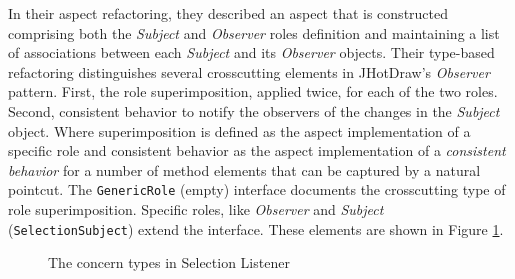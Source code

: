 In their aspect refactoring, they described an aspect that is constructed comprising both the \textit{Subject} and \textit{Observer} roles definition and maintaining a list of associations between each \textit{Subject} and its \textit{Observer} objects.
Their type-based refactoring\cite{marin2005approach} distinguishes several crosscutting elements in JHotDraw's \textit{Observer} pattern. 
First, the role superimposition, applied twice, for each of the two roles. 
Second, consistent behavior to notify the observers of the changes in the \textit{Subject} object.
Where superimposition is defined as the aspect implementation of a specific role and consistent behavior as the aspect implementation of a \textit{consistent behavior} for a number of method elements that can be captured by a natural pointcut.
The \texttt{GenericRole} (empty) interface documents the crosscutting type of role superimposition. 
Specific roles, like \textit{Observer} and \textit{Subject} (\texttt{SelectionSubject}) extend the interface.
These elements are shown in Figure \ref{fig:Concerns_Selection_Listener}.

\begin{figure}[H]
	\centering
  	\caption{The concern types in Selection Listener \cite{marin2005approach}}
  	\label{fig:Concerns_Selection_Listener}
\end{figure}


